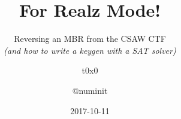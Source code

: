 \documentclass{beamer}
\title{For Realz Mode!}
\subtitle{
    Reversing an MBR from the CSAW CTF\\
    {\em (and how to write a keygen with a SAT solver)}
}
\author{t0x0 \and @numinit}
\institute{\VaporSec}
\date{2017-10-11}
\begin{document}
\begin{frame}
    \titlepage
\end{frame}




\end{document}
